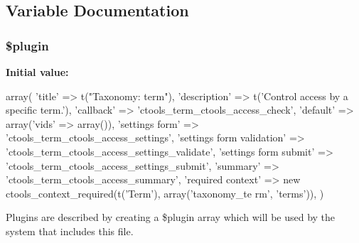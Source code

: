 \subsection{Variable Documentation}
\hypertarget{access_2term_8inc_ada8a7130088351710bb02ed622d6bf65}{
\subsubsection[{\$plugin}]{\setlength{\rightskip}{0pt plus 5cm}\$plugin}}
\label{access_2term_8inc_ada8a7130088351710bb02ed622d6bf65}
{\bfseries Initial value:}
\begin{DoxyCode}
 array(
  'title' => t("Taxonomy: term"),
  'description' => t('Control access by a specific term.'),
  'callback' => 'ctools_term_ctools_access_check',
  'default' => array('vids' => array()),
  'settings form' => 'ctools_term_ctools_access_settings',
  'settings form validation' => 'ctools_term_ctools_access_settings_validate',
  'settings form submit' => 'ctools_term_ctools_access_settings_submit',
  'summary' => 'ctools_term_ctools_access_summary',
  'required context' => new ctools_context_required(t('Term'), array('taxonomy_te
      rm', 'terms')),
)
\end{DoxyCode}
Plugins are described by creating a \$plugin array which will be used by the system that includes this file. 